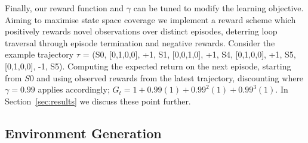\documentclass[conference,compsoc]{IEEEtran}
\begin{document}
Finally, our reward function and $\gamma$ can be tuned to modify the learning objective. Aiming to maximise state space coverage we implement a reward scheme which positively rewards novel observations over distinct episodes, deterring loop traversal through episode termination and negative rewards. Consider the example trajectory $\tau$ = (S0, [0,1,0,0], +1, S1, [0,0,1,0], +1, S4, [0,1,0,0], +1, S5, [0,1,0,0], -1, S5). Computing the expected return on the next episode, starting from $S0$ and using observed rewards from the latest trajectory, discounting where $\gamma = 0.99$ applies accordingly; $G_t = 1 + 0.99(1) + 0.99^{2}(1) + 0.99^{3}(1)$.  In Section~\ref{sec:results} we discuss these point further.



\subsection{Environment Generation}

\end{document}
